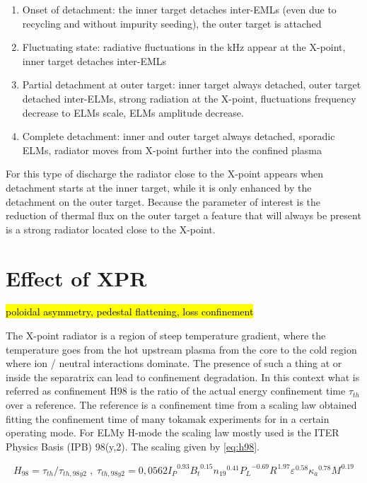 \begin{enumerate}
    \item Onset of detachment: the inner target detaches inter-EMLs (even due to recycling and without impurity seeding), the outer target is attached
    \item Fluctuating state: radiative fluctuations in the kHz appear at the X-point, inner target detaches inter-EMLs
    \item Partial detachment at outer target: inner target always detached, outer target detached inter-ELMs, strong radiation at the X-point, fluctuations frequency decrease to ELMs scale, ELMs amplitude decrease.
    \item Complete detachment: inner and outer target always detached, sporadic ELMs, radiator moves from X-point further into the confined plasma
\end{enumerate}

For this type of discharge the radiator close to the X-point appears when detachment starts at the inner target, while it is only enhanced by the detachment on the outer target. Because the parameter of interest is the reduction of thermal flux on the outer target a feature that will always be present is a strong radiator located close to the X-point.

\section{Effect of XPR}
\hl{poloidal asymmetry, pedestal flattening, loss confinement}


The X-point radiator is a region of steep temperature gradient, where the temperature goes from the hot upstream plasma from the core to the cold region where ion / neutral interactions dominate. The presence of such a thing at or inside the separatrix can lead to confinement degradation. In this context what is referred as confinement H98 is the ratio of the actual energy confinement time $\tau_{th}$ over a reference. The reference is a confinement time from a scaling law obtained fitting the confinement time of many tokamak experiments for in a certain operating mode. For ELMy H-mode the scaling law mostly used is the ITER Physics Basis (IPB) 98(y,2). \cite{Doyle2007} The scaling given by \autoref{eq:h98}.


\begin{equation}
{ H }_{ 98 }={\tau }_{ th }/{\tau }_{ th,98y2 } \; , \; {\tau }_{ th,98y2 }=0,0562 {{ I }_{ P }}^{ 0.93} {{ B }_{ t }}^{ 0.15} {{ n }_{ 19 }}^{ 0.41} {{ P }_{ L }}^{ -0.69} {{ R }_{  }}^{ 1.97} {{ \varepsilon  }_{  }}^{ 0.58} {{ \kappa  }_{ a }}^{ 0.78} {{ M }_{  }}^{ 0.19}
\label{eq:h98}
\end{equation}


